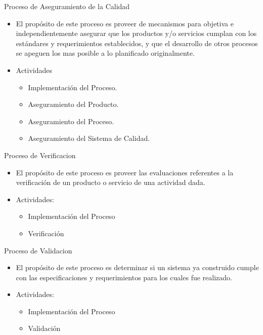 \documentclass{beamer}
\begin{document}
			\begin{frame}{Proceso de Aseguramiento de la Calidad}
				\begin{itemize}
					\item El propósito de este proceso es proveer de mecanismos para objetiva e independientemente asegurar que los productos y/o servicios cumplan con los estándares y requerimientos establecidos, y que el desarrollo de otros procesos se apeguen los mas posible a lo planificado originalmente.
					\item Actividades
			
					\begin{itemize}
						\item Implementación del Proceso.
						\item Aseguramiento del Producto.
						\item Aseguramiento del Proceso.
						\item Aseguramiento del Sistema de Calidad.
					\end{itemize}
				\end{itemize}
			\end{frame}
			
			\begin{frame}{Proceso de Verificacion}
				\begin{itemize}
					\item El propósito de este proceso es proveer las evaluaciones referentes a la verificación de un producto o servicio de una actividad dada.
					\item Actividades:
					
					\begin{itemize}
						\item Implementación del Proceso
						\item Verificación
					\end{itemize}
				\end{itemize}
			\end{frame}
			
				\begin{frame}{Proceso de Validacion}
			
					\begin{itemize}
						\item El propósito de este proceso es determinar si un sistema ya construido cumple con las especificaciones y requerimientos para los cuales fue realizado.
						\item Actividades:
			
						\begin{itemize}
							\item Implementación del Proceso
							\item Validación
						\end{itemize}
			
					\end{itemize}
			
				\end{frame}
			
\end{document}
